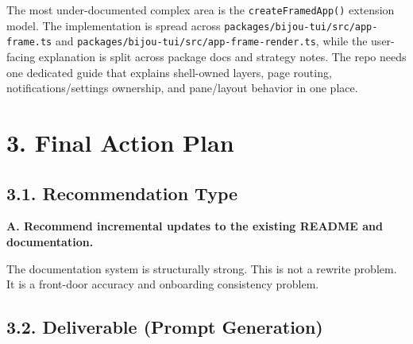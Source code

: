 The most under-documented complex area is the \texttt{c\allowbreak{}r\allowbreak{}e\allowbreak{}a\allowbreak{}t\allowbreak{}e\allowbreak{}F\allowbreak{}r\allowbreak{}a\allowbreak{}m\allowbreak{}e\allowbreak{}d\allowbreak{}A\allowbreak{}p\allowbreak{}p\allowbreak{}(\allowbreak{})} extension model. The implementation is spread across \texttt{p\allowbreak{}a\allowbreak{}c\allowbreak{}k\allowbreak{}a\allowbreak{}g\allowbreak{}e\allowbreak{}s\allowbreak{}/\allowbreak{}b\allowbreak{}i\allowbreak{}j\allowbreak{}o\allowbreak{}u\allowbreak{}-\allowbreak{}t\allowbreak{}u\allowbreak{}i\allowbreak{}/\allowbreak{}s\allowbreak{}r\allowbreak{}c\allowbreak{}/\allowbreak{}a\allowbreak{}p\allowbreak{}p\allowbreak{}-\allowbreak{}f\allowbreak{}r\allowbreak{}a\allowbreak{}m\allowbreak{}e\allowbreak{}.\allowbreak{}t\allowbreak{}s} and \texttt{p\allowbreak{}a\allowbreak{}c\allowbreak{}k\allowbreak{}a\allowbreak{}g\allowbreak{}e\allowbreak{}s\allowbreak{}/\allowbreak{}b\allowbreak{}i\allowbreak{}j\allowbreak{}o\allowbreak{}u\allowbreak{}-\allowbreak{}t\allowbreak{}u\allowbreak{}i\allowbreak{}/\allowbreak{}s\allowbreak{}r\allowbreak{}c\allowbreak{}/\allowbreak{}a\allowbreak{}p\allowbreak{}p\allowbreak{}-\allowbreak{}f\allowbreak{}r\allowbreak{}a\allowbreak{}m\allowbreak{}e\allowbreak{}-\allowbreak{}r\allowbreak{}e\allowbreak{}n\allowbreak{}d\allowbreak{}e\allowbreak{}r\allowbreak{}.\allowbreak{}t\allowbreak{}s}, while the user-facing explanation is split across package docs and strategy notes. The repo needs one dedicated guide that explains shell-owned layers, page routing, notifications/settings ownership, and pane/layout behavior in one place.

\section{3. Final Action Plan}\label{record-417-final-action-plan}

\subsection{3.1. Recommendation Type}\label{record-417-recommendation-type}

\textbf{A. Recommend incremental updates to the existing README and documentation.}

The documentation system is structurally strong. This is not a rewrite problem. It is a front-door accuracy and onboarding consistency problem.

\subsection{3.2. Deliverable (Prompt Generation)}\label{record-417-deliverable-prompt-generation}

